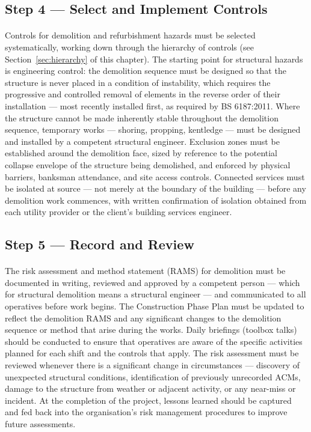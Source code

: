 \subsection{Step 4 --- Select and Implement Controls}

\paragraph{}
Controls for demolition and refurbishment hazards must be selected systematically, working down through the hierarchy of controls (see Section~\ref{sec:hierarchy} of this chapter). The starting point for structural hazards is engineering control: the demolition sequence must be designed so that the structure is never placed in a condition of instability, which requires the progressive and controlled removal of elements in the reverse order of their installation — most recently installed first, as required by BS 6187:2011. Where the structure cannot be made inherently stable throughout the demolition sequence, temporary works — shoring, propping, kentledge — must be designed and installed by a competent structural engineer. Exclusion zones must be established around the demolition face, sized by reference to the potential collapse envelope of the structure being demolished, and enforced by physical barriers, banksman attendance, and site access controls. Connected services must be isolated at source — not merely at the boundary of the building — before any demolition work commences, with written confirmation of isolation obtained from each utility provider or the client's building services engineer.

\subsection{Step 5 --- Record and Review}

\paragraph{}
The risk assessment and method statement (RAMS) for demolition must be documented in writing, reviewed and approved by a competent person — which for structural demolition means a structural engineer — and communicated to all operatives before work begins. The Construction Phase Plan must be updated to reflect the demolition RAMS and any significant changes to the demolition sequence or method that arise during the works. Daily briefings (toolbox talks) should be conducted to ensure that operatives are aware of the specific activities planned for each shift and the controls that apply. The risk assessment must be reviewed whenever there is a significant change in circumstances — discovery of unexpected structural conditions, identification of previously unrecorded ACMs, damage to the structure from weather or adjacent activity, or any near-miss or incident. At the completion of the project, lessons learned should be captured and fed back into the organisation's risk management procedures to improve future assessments.

